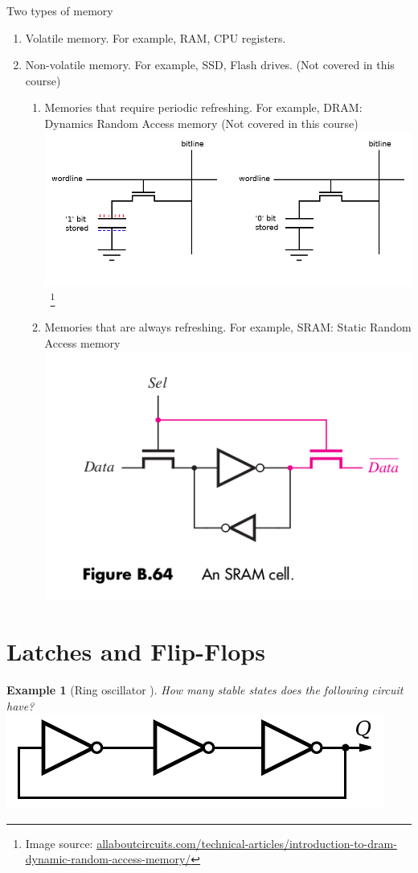 \documentclass{article}
\newtheorem{example}{Example}
\begin{document}
Two types of memory
\begin{enumerate}
  \item Volatile memory. For example, RAM, CPU registers.
  \item Non-volatile memory. For example, SSD, Flash drives. (Not covered in this course)
    \begin{enumerate}
    \item Memories that require periodic refreshing. For example, DRAM: Dynamics Random Access memory (Not covered in this course)\\
      \includegraphics[width=0.6\linewidth]{./fig/DRAM-cell.png}~\footnote{Image
        source: \url{allaboutcircuits.com/technical-articles/introduction-to-dram-dynamic-random-access-memory/}}
    \item Memories that are always refreshing. For example, SRAM: Static Random
      Access memory~\cite[Appendix~B.64]{stephen2022fundamentals}\\
      \includegraphics[width=0.4\linewidth]{./fig/SRAM-cell.png}
    \end{enumerate}
\end{enumerate}

\section{Latches and Flip-Flops \cite[Sec~3.2]{harris2022digital}}

\begin{example}[Ring oscillator ] \cite[Sec~3.31]{harris2022digital}
  How many stable states does the following circuit have?\\
  \includegraphics[width=0.6\linewidth]{./fig/ring-oscillator.pdf} 
\end{example}
\vspace{10em}
\end{document}
